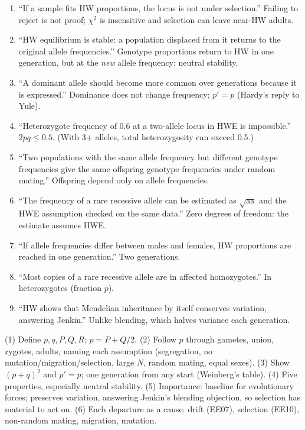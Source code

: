 \begin{statements}
\begin{enumerate}[label=\arabic*.]
\item ``If a sample fits HW proportions, the locus is not under selection.''
\F Failing to reject is not proof; $\chi^2$ is insensitive and selection can leave near-HW adults.
\item ``HW equilibrium is stable: a population displaced from it returns to the original allele frequencies.''
\F Genotype proportions return to HW in one generation, but at the \emph{new} allele frequency: neutral stability.
\item ``A dominant allele should become more common over generations because it is expressed.''
\F Dominance does not change frequency; $p'=p$ (Hardy's reply to Yule).
\item ``Heterozygote frequency of 0.6 at a two-allele locus in HWE is impossible.''
\T $2pq\le0.5$. (With 3+ alleles, total heterozygosity can exceed 0.5.)
\item ``Two populations with the same allele frequency but different genotype frequencies give the same offspring genotype frequencies under random mating.''
\T Offspring depend only on allele frequencies.
\item ``The frequency of a rare recessive allele can be estimated as $\sqrt{\text{aa}}$ and the HWE assumption checked on the same data.''
\F Zero degrees of freedom: the estimate assumes HWE.
\item ``If allele frequencies differ between males and females, HW proportions are reached in one generation.''
\F Two generations.
\item ``Most copies of a rare recessive allele are in affected homozygotes.''
\F In heterozygotes (fraction $p$).
\item ``HW shows that Mendelian inheritance by itself conserves variation, answering Jenkin.''
\T Unlike blending, which halves variance each generation.
\end{enumerate}
\end{statements}

\begin{longans}
(1) Define $p,q,P,Q,R$; $p=P+Q/2$. (2) Follow $p$ through gametes, union, zygotes, adults, naming each assumption
(segregation, no mutation/migration/selection, large $N$, random mating, equal sexes). (3) Show $(p+q)^2$ and $p'=p$; one
generation from any start (Weinberg's table). (4) Five properties, especially neutral stability. (5) Importance: baseline
for evolutionary forces; preserves variation, answering Jenkin's blending objection, so selection has material to act on.
(6) Each departure as a cause: drift (EE07), selection (EE10), non-random mating, migration, mutation.
\end{longans}

